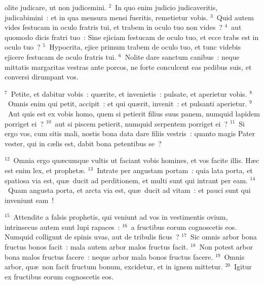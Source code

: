 \bchapter
{}olite judicare, ut non judicemini.
${}^{2}$~In quo enim judicio judicaveritis, judicabimini~: et in qua mensura mensi fueritis, remetietur vobis.
${}^{3}$~Quid autem vides festucam in oculo fratris tui, et trabem in oculo tuo non vides~?
${}^{4}$~aut quomodo dicis fratri tuo~: Sine ejiciam festucam de oculo tuo, et ecce trabs est in oculo tuo~?
${}^{5}$~Hypocrita, ejice primum trabem de oculo tuo, et tunc videbis ejicere festucam de oculo fratris tui.
${}^{6}$~Nolite dare sanctum canibus~: neque mittatis margaritas vestras ante porcos, ne forte conculcent eas pedibus suis, et conversi dirumpant vos.


${}^{7}$~Petite, et dabitur vobis~: qu\ae rite, et invenietis~: pulsate, et aperietur vobis.
${}^{8}$~Omnis enim qui petit, accipit~: et qui qu\ae rit, invenit~: et pulsanti aperietur.
${}^{9}$~Aut quis est ex vobis homo, quem si petierit filius suus panem, numquid lapidem porriget ei~?
${}^{10}$~aut si piscem petierit, numquid serpentem porriget ei~?
${}^{11}$~Si ergo vos, cum sitis mali, nostis bona data dare filiis vestris~: quanto magis Pater vester, qui in c\ae lis est, dabit bona petentibus se~?


${}^{12}$~Omnia ergo qu\ae cumque vultis ut faciant vobis homines, et vos facite illis. H\ae c est enim lex, et prophet\ae .
${}^{13}$~Intrate per angustam portam~: quia lata porta, et spatiosa via est, qu\ae\ ducit ad perditionem, et multi sunt qui intrant per eam.
${}^{14}$~Quam angusta porta, et arcta via est, qu\ae\ ducit ad vitam~: et pauci sunt qui inveniunt eam~!


${}^{15}$~Attendite a falsis prophetis, qui veniunt ad vos in vestimentis ovium, intrinsecus autem sunt lupi rapaces~:
${}^{16}$~a fructibus eorum cognoscetis eos. Numquid colligunt de spinis uvas, aut de tribulis ficus~?
${}^{17}$~Sic omnis arbor bona fructus bonos facit~: mala autem arbor malos fructus facit.
${}^{18}$~Non potest arbor bona malos fructus facere~: neque arbor mala bonos fructus facere.
${}^{19}$~Omnis arbor, qu\ae\ non facit fructum bonum, excidetur, et in ignem mittetur.
${}^{20}$~Igitur ex fructibus eorum cognoscetis eos.


